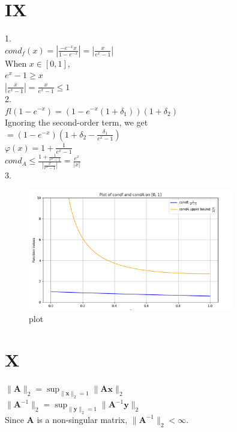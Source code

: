 \documentclass[a4paper]{article}
\begin{document}
\section*{IX}
1.\\
$cond_f(x)=|\frac{-e^{-x}x}{1-e^{-x}}|=|\frac{x}{e^x-1}|$\\
When $x \in [0,1]$,\\
$e^x-1\geq x$\\
$|\frac{x}{e^x-1}|=\frac{x}{e^x-1} \leq 1$\\
2.\\
$fl(1-e^{-x})=(1-e^{-x}(1+\delta_1))(1+\delta_2)$\\
Ignoring the second-order term, we get\\
$=(1-e^{-x})(1+\delta_2-\frac{\delta_1}{e^x-1})$\\
$\varphi(x)=1+\frac{1}{e^{x}-1}$\\
$cond_A \leq \frac{1+\frac{1}{e^{x}-1}}{|\frac{x}{e^x-1}|}=\frac{e^x}{|x|}$\\

3.\\
\begin{figure}[h]
  \centering
  \includegraphics[width=0.8\textwidth]{plot.jpg}
  \caption{plot}
  \label{fig:condf}
\end{figure}

\section*{X}

   $\|\mathbf{A}\|_2 = \sup_{\|\mathbf{x}\|_2 = 1} \|\mathbf{A}\mathbf{x}\|_2$\\

   $\|\mathbf{A}^{-1}\|_2 = \sup_{\|\mathbf{y}\|_2 = 1} \|\mathbf{A}^{-1}\mathbf{y}\|_2$\\

Since $\mathbf{A}$ is a non-singular matrix, $\|\mathbf{A}^{-1}\|_2 < \infty$.\\
\end{document}
